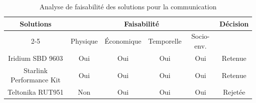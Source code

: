 \begin{table}[H]
    \centering
\begin{tabular}{|c|c|c|c|c|c|}
    \hline
    \centering
    \textbf{Solutions} & \multicolumn{4}{c|}{Faisabilité} & \textbf{Décision} \\
    \cline{2-5}
    & Physique & Économique & Temporelle & Socio-env. & \\
    \hline
    Iridium SBD 9603 & Oui & Oui & Oui & Oui & Retenue \\
    \hline
    Starlink Performance Kit & Oui & Oui & Oui & Oui & Retenue \\
    \hline
    Teltonika RUT951 & Non & Oui & Oui & Oui & Rejetée \\
    \hline
\end{tabular}
\caption{Analyse de faisabilité des solutions pour la communication}
\label{tab:faisabiliteCommunication}
\end{table}
